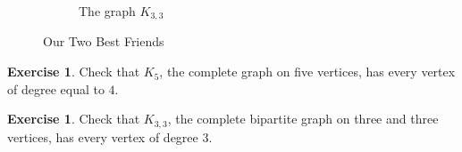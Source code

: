 \documentclass[12pt,letterpaper]{article}
\theoremstyle{definition}
\newtheorem{exercise}[question]{Exercise}
\begin{document}
\begin{figure}[h]
\begin{subfigure}[b]{.4\textwidth}
\caption{The graph $K_{3,3}$}
\label{figure:k33}
\end{subfigure}
\caption{Our Two Best Friends}
\label{figure:complete_graphs}
\end{figure}


\begin{exercise}
Check that $K_5$, the complete graph on five vertices, has every vertex of degree equal to $4$. 
\end{exercise}

\begin{exercise}
Check that $K_{3,3}$, the complete bipartite graph on three and three vertices, has every vertex of degree $3$.
\end{exercise}

\end{document}

